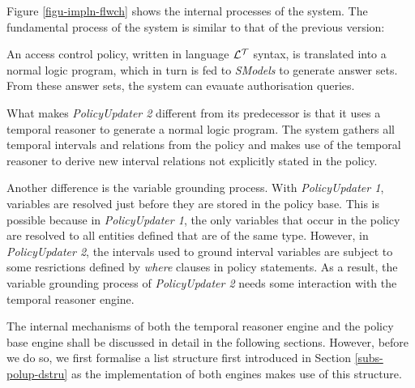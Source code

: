 \documentclass[11pt]{report}
\begin{document}
      Figure \ref{figu-impln-flwch} shows the internal processes of the system.
      The fundamental process of the system is similar to that of the
      previous version:

      An access control policy, written in language ${\cal L^T}$ syntax, is
      translated into a normal logic program, which in turn is fed to
      {\em SModels} to generate answer sets. From these answer sets, the system
      can evauate authorisation queries.

      What makes {\em PolicyUpdater 2} different from its predecessor is that
      it uses a temporal reasoner to generate a normal logic program. The
      system gathers all temporal intervals and relations from the policy and
      makes use of the temporal reasoner to derive new interval relations not
      explicitly stated in the policy.

      Another difference is the variable grounding process. With
      {\em PolicyUpdater 1}, variables are resolved just before they are stored
      in the policy base. This is possible because in {\em PolicyUpdater 1},
      the only variables that occur in the policy are resolved to all entities
      defined that are of the same type. However, in {\em PolicyUpdater 2},
      the intervals used to ground interval variables are subject to some
      resrictions defined by {\em where} clauses in policy statements. As a
      result, the variable grounding process of {\em PolicyUpdater 2} needs
      some interaction with the temporal reasoner engine.

      The internal mechanisms of both the temporal reasoner engine and the
      policy base engine shall be discussed in detail in the following
      sections. However, before we do so, we first formalise a list structure 
      first introduced in Section \ref{subs-polup-dstru} as the implementation
      of both engines makes use of this structure.
\end{document}

